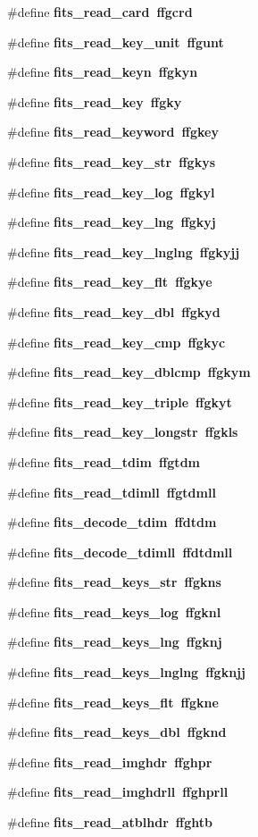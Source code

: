 \begin{CompactItemize}
\item 
\#define \bf{fits\_\-read\_\-card}~ffgcrd
\item 
\#define \bf{fits\_\-read\_\-key\_\-unit}~ffgunt
\item 
\#define \bf{fits\_\-read\_\-keyn}~ffgkyn
\item 
\#define \bf{fits\_\-read\_\-key}~ffgky
\item 
\#define \bf{fits\_\-read\_\-keyword}~ffgkey
\item 
\#define \bf{fits\_\-read\_\-key\_\-str}~ffgkys
\item 
\#define \bf{fits\_\-read\_\-key\_\-log}~ffgkyl
\item 
\#define \bf{fits\_\-read\_\-key\_\-lng}~ffgkyj
\item 
\#define \bf{fits\_\-read\_\-key\_\-lnglng}~ffgkyjj
\item 
\#define \bf{fits\_\-read\_\-key\_\-flt}~ffgkye
\item 
\#define \bf{fits\_\-read\_\-key\_\-dbl}~ffgkyd
\item 
\#define \bf{fits\_\-read\_\-key\_\-cmp}~ffgkyc
\item 
\#define \bf{fits\_\-read\_\-key\_\-dblcmp}~ffgkym
\item 
\#define \bf{fits\_\-read\_\-key\_\-triple}~ffgkyt
\item 
\#define \bf{fits\_\-read\_\-key\_\-longstr}~ffgkls
\item 
\#define \bf{fits\_\-read\_\-tdim}~ffgtdm
\item 
\#define \bf{fits\_\-read\_\-tdimll}~ffgtdmll
\item 
\#define \bf{fits\_\-decode\_\-tdim}~ffdtdm
\item 
\#define \bf{fits\_\-decode\_\-tdimll}~ffdtdmll
\item 
\#define \bf{fits\_\-read\_\-keys\_\-str}~ffgkns
\item 
\#define \bf{fits\_\-read\_\-keys\_\-log}~ffgknl
\item 
\#define \bf{fits\_\-read\_\-keys\_\-lng}~ffgknj
\item 
\#define \bf{fits\_\-read\_\-keys\_\-lnglng}~ffgknjj
\item 
\#define \bf{fits\_\-read\_\-keys\_\-flt}~ffgkne
\item 
\#define \bf{fits\_\-read\_\-keys\_\-dbl}~ffgknd
\item 
\#define \bf{fits\_\-read\_\-imghdr}~ffghpr
\item 
\#define \bf{fits\_\-read\_\-imghdrll}~ffghprll
\item 
\#define \bf{fits\_\-read\_\-atblhdr}~ffghtb

\end{CompactItemize}

